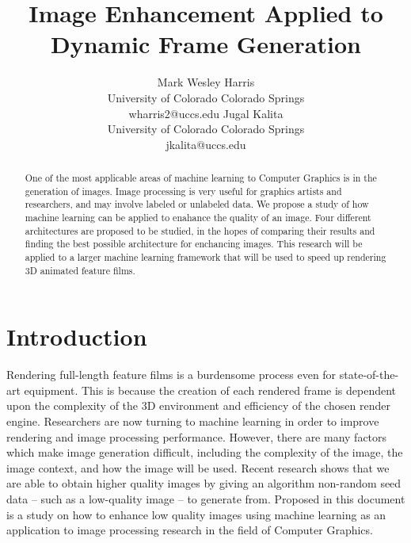 \documentclass[letterpaper]{article} %
\title{Image Enhancement Applied to Dynamic Frame Generation}
\author{Mark Wesley Harris\\ %
University of Colorado Colorado Springs\\
wharris2@uccs.edu %
\And
Jugal Kalita\\
University of Colorado Colorado Springs\\
jkalita@uccs.edu
}
\begin{document}
\maketitle

\begin{abstract}
One of the most applicable areas of machine learning to Computer Graphics is in the
generation of images. Image processing is very useful for graphics artists and
researchers, and may involve labeled or unlabeled data. We propose
a study of how machine learning can be applied to enahance the quality of an image.
Four different architectures are proposed to be studied, in the hopes of comparing
their results and finding the best possible architecture for enchancing images.
This research will be applied to a larger machine learning framework that will be used to
speed up rendering 3D animated feature films.
\end{abstract}

\section{Introduction}
\label{sec:introduction}
Rendering full-length feature films is a burdensome process
even for state-of-the-art equipment.
This is because the creation of each rendered frame is dependent upon the
complexity of the 3D environment and
efficiency of the chosen render engine.
Researchers are now turning to machine learning in order to improve
rendering and image processing performance.
However, there are many factors which make image generation difficult, including
the complexity of the image, the image context, and how the image will be used.
Recent research shows that we are able to obtain higher quality images by giving
an algorithm non-random seed data -- such as a low-quality image -- to generate from.
Proposed in this document is a study
on how to enhance low quality images using machine learning
as an application to image processing research in the field of Computer Graphics.

\end{document}
